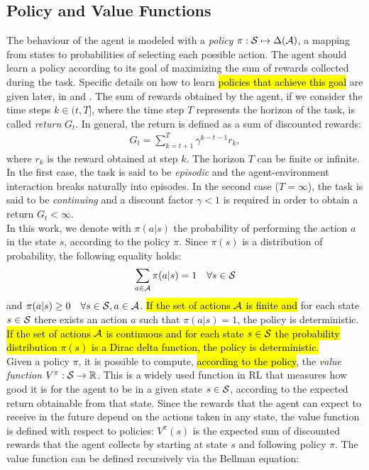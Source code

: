 \subsection{Policy and Value Functions}
The behaviour of the agent is modeled with a \emph{policy} $\pi: \mathcal{S} \mapsto \Delta(\mathcal{A})$, \ie a mapping from states to probabilities of selecting each possible action. The agent should learn a policy according to its goal of maximizing the sum of rewards collected during the task. Specific details on how to learn \hl{policies that achieve this goal} are given later, in  and . The sum of rewards obtained by the agent, if we consider the time steps $k \in (t, T]$, where the time step $T$ represents the horizon of the task, is called \emph{return} $G_t$. In general, the return is defined as a sum of discounted rewards:
\begin{align}G_t = \sum_{k=t+1}^{T} \gamma^{k-t-1} r_k, \end{align} where $r_k$ is the reward obtained at step $k$. The horizon $T$ can be finite or infinite. In the first case, the task is said to be \emph{episodic} and the agent-environment interaction breaks naturally into episodes. In the second case (\ie $T = \infty$), the task is said to be \emph{continuing} and a discount factor $\gamma<1$ is required in order to obtain a return $G_t < \infty$.\\
\newline
In this work, we denote with $\pi(a|s)$ the probability of performing the action $a$ in the state $s$, according to the policy $\pi$. Since $\pi(s)$ is a distribution of probability, the following equality holds:
\begin{align} \sum_{a \in \mathcal{A}} \pi(a|s) = 1 \quad \forall s \in \mathcal{S} \end{align}
and $\pi(a|s) \geq 0 \quad \forall s \in \mathcal{S}, a \in \mathcal{A}$.
\hl{If the set of actions $\mathcal{A}$ is finite and} for each state $s \in \mathcal{S}$ there exists an action $a$ such that $\pi(a|s) = 1$, the policy is deterministic. \hl{If the set of actions $\mathcal{A}$ is continuous and for each state $s \in \mathcal{S}$ the probability distribution $\pi(s)$ is a Dirac delta function, the policy is deterministic.}\\
\newline
Given a policy $\pi$, it is possible to compute, \hl{according to the policy}, the \emph{value function} $V^{\pi}: \mathcal{S} \rightarrow \mathbb{R}$. This is a widely used function in \ac{RL} that measures how good it is for the agent to be in a given state $s \in \mathcal{S}$, according to the expected return obtainable from that state. Since the rewards that the agent can expect to receive in the future depend on the actions taken in any state, the value function is defined with respect to policies: $V^{\pi}(s)$ is the expected sum of discounted rewards that the agent collects by starting at state $s$ and following policy $\pi$. The value function can be defined recursively via the Bellman equation: 
